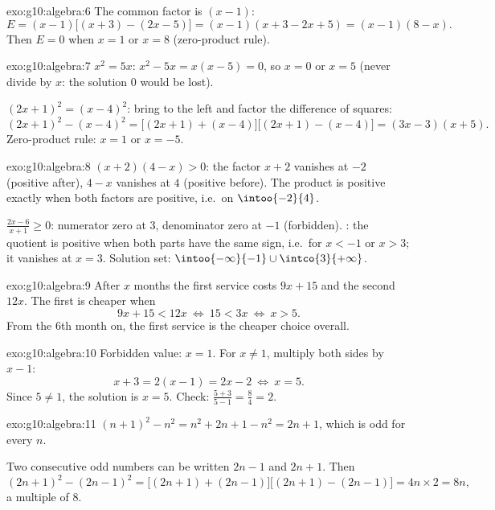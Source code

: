 \begin{solution}{exo:g10:algebra:6}
The common factor is $(x-1)$:
\[
E = (x-1)\bigl[(x+3) - (2x - 5)\bigr] = (x-1)(x + 3 - 2x + 5)
= (x-1)(8 - x).
\]
Then $E = 0$ when $x = 1$ or $x = 8$ (zero-product rule).
\end{solution}

\begin{solution}{exo:g10:algebra:7}
$x^2 = 5x$: $x^2 - 5x = x(x - 5) = 0$, so $x = 0$ or $x = 5$ (never
divide by $x$: the solution $0$ would be lost).

$(2x+1)^2 = (x-4)^2$: bring to the left and factor the difference of
squares:
\[
(2x+1)^2 - (x-4)^2
= \bigl[(2x+1) + (x-4)\bigr]\bigl[(2x+1) - (x-4)\bigr]
= (3x - 3)(x + 5).
\]
Zero-product rule: $x = 1$ or $x = -5$.
\end{solution}

\begin{solution}{exo:g10:algebra:8}
$(x+2)(4-x) > 0$: the factor $x + 2$ vanishes at $-2$ (positive after),
$4 - x$ vanishes at $4$ (positive before). The product is positive
exactly when both factors are positive, i.e.\ on $\intoo{-2}{4}$.

$\frac{2x-6}{x+1} \geq 0$: numerator zero at $3$, denominator zero at
$-1$ (forbidden). : the quotient is positive when both parts
have the same sign, i.e.\ for $x < -1$ or $x > 3$; it vanishes at $x = 3$.
Solution set: $\intoo{-\infty}{-1} \cup \intco{3}{+\infty}$.
\end{solution}

\begin{solution}{exo:g10:algebra:9}
After $x$ months the first service costs $9x + 15$ and the second $12x$.
The first is cheaper when
\[
9x + 15 < 12x
\ \Longleftrightarrow\
15 < 3x
\ \Longleftrightarrow\
x > 5 .
\]
From the $6$th month on, the first service is the cheaper choice overall.
\end{solution}

\begin{solution}{exo:g10:algebra:10}
Forbidden value: $x = 1$. For $x \neq 1$, multiply both sides by $x - 1$:
\[
x + 3 = 2(x - 1) = 2x - 2
\ \Longleftrightarrow\
x = 5 .
\]
Since $5 \neq 1$, the solution is $x = 5$. Check:
$\frac{5+3}{5-1} = \frac84 = 2$.
\end{solution}

\begin{solution}{exo:g10:algebra:11}
$(n+1)^2 - n^2 = n^2 + 2n + 1 - n^2 = 2n + 1$, which is odd for every
 $n$.

Two consecutive odd numbers can be written $2n - 1$ and $2n + 1$. Then
\[
(2n+1)^2 - (2n-1)^2
= \bigl[(2n+1)+(2n-1)\bigr]\bigl[(2n+1)-(2n-1)\bigr]
= 4n \times 2 = 8n,
\]
a multiple of $8$.
\end{solution}

